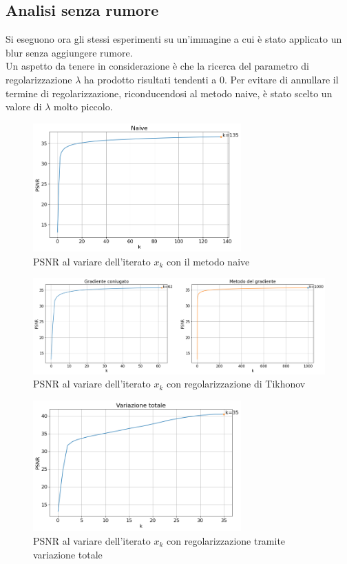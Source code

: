 \documentclass[11pt]{article}
\begin{document}
\subsection{Analisi senza rumore}
Si eseguono ora gli stessi esperimenti su un'immagine a cui è stato applicato un blur senza aggiungere rumore.\\
Un aspetto da tenere in considerazione è che la ricerca del parametro di regolarizzazione $\lambda$ ha prodotto risultati tendenti a 0. Per evitare di annullare il termine di regolarizzazione, riconducendosi al metodo naive, è stato scelto un valore di $\lambda$ molto piccolo.

\begin{figure}[H]
    \centering
    \includegraphics[width=8cm]{semiconvergenza/3/psnr_naive.png}
    \caption{PSNR al variare dell'iterato $x_k$ con il metodo naive}
    \label{fig:semiconv_psnr_naive3}
\end{figure}
\begin{figure}[H]
    \centering
    \includegraphics[width=13cm]{semiconvergenza/3/psnr_tikhonov.png}
    \caption{PSNR al variare dell'iterato $x_k$ con regolarizzazione di Tikhonov}
    \label{fig:semiconv_deblur_tikhonov3}
\end{figure}
\begin{figure}[H]
    \centering
    \includegraphics[width=8cm]{semiconvergenza/3/psnr_tv.png}
    \caption{PSNR al variare dell'iterato $x_k$ con regolarizzazione tramite variazione totale}
    \label{fig:semiconv_deblur_tv3}
\end{figure}
\end{document}
